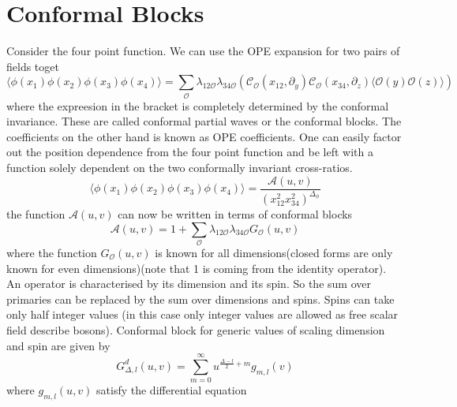         \section{Conformal Blocks}
            Consider the four point function. We can use the OPE expansion for two pairs of fields toget
            \begin{equation}\label{12decomposition}
                \langle\phi(x_1)\phi(x_2)\phi(x_3)\phi(x_4)\rangle = \sum_{\mathcal{O}}\lambda_{12\mathcal{O}}\lambda_{34\mathcal{O}}\left(\mathcal{C}_{\mathcal{O}}(x_{12},\partial_y)\mathcal{C}_{\mathcal{O}}(x_{34},\partial_z)\langle\mathcal{O}(y)\mathcal{O}(z) \rangle \right)
            \end{equation}
            where the expreesion in the bracket is completely determined by the conformal invariance. These are called conformal partial waves or the conformal blocks. The coefficients on the other hand is known as OPE coefficients. One can easily factor out the position dependence from the four point function and be left with a function solely dependent on the two conformally invariant cross-ratios. 
            \begin{equation}
                \langle\phi(x_1)\phi(x_2)\phi(x_3)\phi(x_4)\rangle = \frac{\mathcal{A}(u,v)}{(x_{12}^2x_{34}^2)^{\Delta_{\phi}}}
            \end{equation} 
            the function $\mathcal{A}(u,v)$ can now be written in terms of conformal blocks
            \begin{equation}
                \mathcal{A}(u,v) = 1 + \sum_{\mathcal{O}}\lambda_{12\mathcal{O}}\lambda_{34\mathcal{O}}G_{\mathcal{O}}(u,v)
            \end{equation}
            where the function $G_{\mathcal{O}}(u,v)$ is known for all dimensions(closed forms are only known for even dimensions)(note that 1 is coming from the identity operator). \\
            An operator is characterised by its dimension and its spin. So the sum over primaries can be replaced by the sum over dimensions and spins. Spins can take only half integer values (in this case only integer values are allowed as free scalar field describe bosons). Conformal block for generic values of scaling dimension and spin are given by
            \begin{equation}\label{uvexpansionofblock}
                G_{\Delta,l}^{d}(u,v) = \sum_{m=0}^{\infty} u^{\frac{\Delta-l}{2}+m} g_{m,l}(v)
            \end{equation}
            where $g_{m,l}(u,v)$ satisfy the differential equation\cite{regge}
